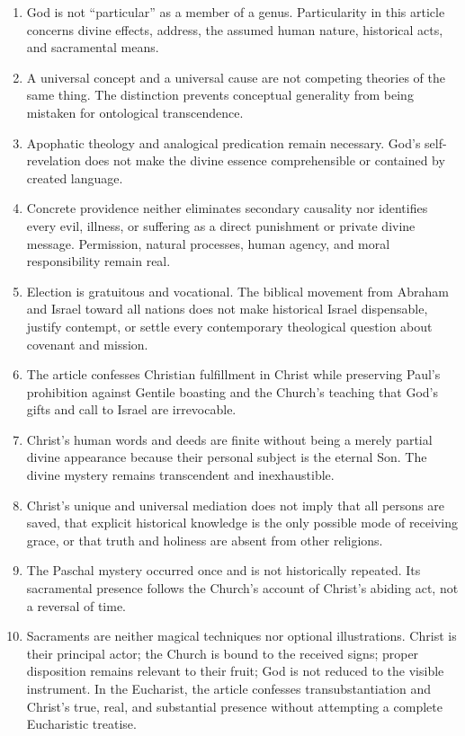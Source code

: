 \begin{enumerate}[leftmargin=1.45em,itemsep=0.25em]
\item God is not ``particular'' as a member of a genus. Particularity in this article concerns divine effects, address, the assumed human nature, historical acts, and sacramental means.
\item A universal concept and a universal cause are not competing theories of the same thing. The distinction prevents conceptual generality from being mistaken for ontological transcendence.
\item Apophatic theology and analogical predication remain necessary. God's self-revelation does not make the divine essence comprehensible or contained by created language.
\item Concrete providence neither eliminates secondary causality nor identifies every evil, illness, or suffering as a direct punishment or private divine message. Permission, natural processes, human agency, and moral responsibility remain real.
\item Election is gratuitous and vocational. The biblical movement from Abraham and Israel toward all nations does not make historical Israel dispensable, justify contempt, or settle every contemporary theological question about covenant and mission.
\item The article confesses Christian fulfillment in Christ while preserving Paul's prohibition against Gentile boasting and the Church's teaching that God's gifts and call to Israel are irrevocable.
\item Christ's human words and deeds are finite without being a merely partial divine appearance because their personal subject is the eternal Son. The divine mystery remains transcendent and inexhaustible.
\item Christ's unique and universal mediation does not imply that all persons are saved, that explicit historical knowledge is the only possible mode of receiving grace, or that truth and holiness are absent from other religions.
\item The Paschal mystery occurred once and is not historically repeated. Its sacramental presence follows the Church's account of Christ's abiding act, not a reversal of time.
\item Sacraments are neither magical techniques nor optional illustrations. Christ is their principal actor; the Church is bound to the received signs; proper disposition remains relevant to their fruit; God is not reduced to the visible instrument. In the Eucharist, the article confesses transubstantiation and Christ's true, real, and substantial presence without attempting a complete Eucharistic treatise.

\end{enumerate}
